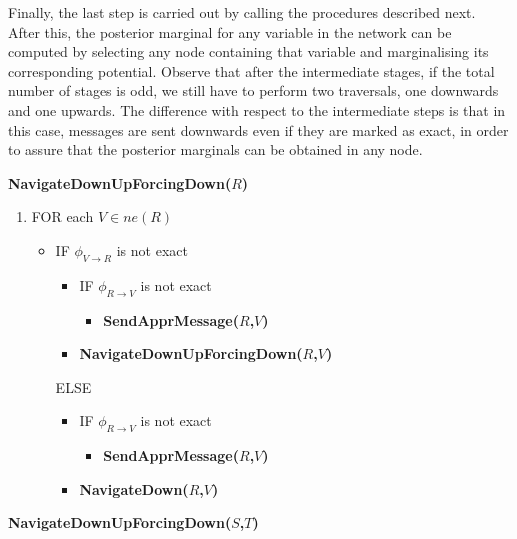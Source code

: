 Finally, the last step is carried out by calling the procedures described
next. After this, the posterior marginal for any variable in the network
can be computed by selecting any node containing that variable and
marginalising its corresponding potential. Observe that after the
intermediate stages, if the total number of stages is odd, we still have
to perform two traversals, one downwards and one upwards. The difference
with respect to the intermediate steps is that in this case, messages are
sent downwards even if they are marked as exact, in order to assure that
the posterior marginals can be obtained in any node.

\bigskip\noindent
\textsf{\textbf{NavigateDownUpForcingDown($R$)}}

\begin{enumerate}
\item FOR each $V\in ne(R)$
  
  \begin{itemize}
  \item[] IF $\phi_{V\rightarrow R}$ is not exact
    \begin{itemize}
    \item[] IF $\phi_{R\rightarrow V}$ is not exact
      \begin{itemize}
      \item[] \textsf{\textbf{SendApprMessage($R$,$V$)}}
      \end{itemize}
    \item[] \textsf{\textbf{NavigateDownUpForcingDown($R$,$V$)}}
    \end{itemize}
    ELSE
    \begin{itemize}
    \item[] IF $\phi_{R\rightarrow V}$ is not exact
      \begin{itemize}
      \item[] \textsf{\textbf{SendApprMessage($R$,$V$)}}
      \end{itemize}
    \item[] \textsf{\textbf{NavigateDown($R$,$V$)}}
    \end{itemize}
  \end{itemize}
\end{enumerate}


\bigskip\noindent
\textsf{\textbf{NavigateDownUpForcingDown($S$,$T$)}}

